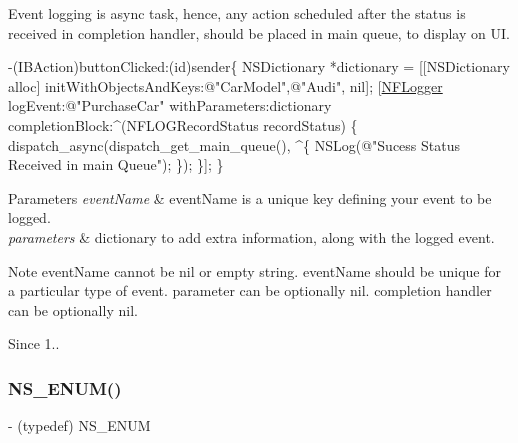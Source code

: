 Event logging is async task, hence, any action scheduled after the status is received in completion handler, should be placed in main queue, to display on UI.


\begin{DoxyCode}
-(IBAction)buttonClicked:(\textcolor{keywordtype}{id})sender\{
 NSDictionary *dictionary = [[NSDictionary alloc] initWithObjectsAndKeys:\textcolor{stringliteral}{@"CarModel"},\textcolor{stringliteral}{@"Audi"}, nil];
 [\hyperlink{interface_n_f_logger}{NFLogger} logEvent:\textcolor{stringliteral}{@"PurchaseCar"} withParameters:dictionary completionBlock:^(NFLOGRecordStatus 
      recordStatus) \{
      dispatch\_async(dispatch\_get\_main\_queue(), ^\{
          NSLog(\textcolor{stringliteral}{@"Sucess Status Received in main Queue"});
          \});
  \}];
\}
\end{DoxyCode}



\begin{DoxyParams}{Parameters}
{\em event\+Name} & event\+Name is a unique key defining your event to be logged. \\
\hline
{\em parameters} & dictionary to add extra information, along with the logged event.\\
\hline
\end{DoxyParams}
\begin{DoxyNote}{Note}
event\+Name cannot be nil or empty string. event\+Name should be unique for a particular type of event. parameter can be optionally nil. completion handler can be optionally nil. 
\end{DoxyNote}
\begin{DoxySince}{Since}
1.. 
\end{DoxySince}
\mbox{\label{interface_n_f_logger_ab785af89c63637bf04e29bebc0d781de}} 
\subsubsection{\texorpdfstring{N\+S\+\_\+\+E\+N\+U\+M()}{NS\_ENUM()}\hspace{0.1cm}{\footnotesize\ttfamily [1/3]}}
{\footnotesize\ttfamily -\/ (typedef) N\+S\+\_\+\+E\+N\+UM \begin{DoxyParamCaption}\item[{(N\+S\+U\+Integer)}]{ }\item[{(N\+F\+L\+O\+G\+Record\+Status)}]{ }\end{DoxyParamCaption}}



